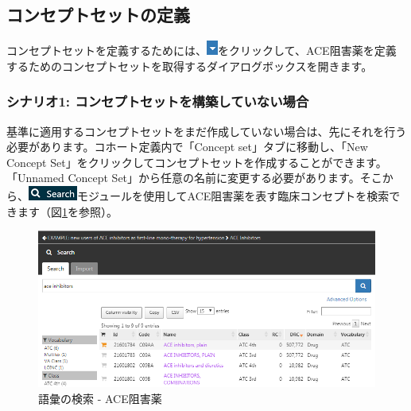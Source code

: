 \documentclass[
  11pt]{book}
\theoremstyle{definition}
\theoremstyle{definition}
\theoremstyle{definition}
\theoremstyle{definition}
\theoremstyle{remark}
\begin{document}
\subsection{コンセプトセットの定義}\label{ux30b3ux30f3ux30bbux30d7ux30c8ux30bbux30c3ux30c8ux306eux5b9aux7fa9}

コンセプトセットを定義するためには、\includegraphics{images/Cohorts/downarrow.png}をクリックして、ACE阻害薬を定義するためのコンセプトセットを取得するダイアログボックスを開きます。

\subsubsection*{シナリオ1: コンセプトセットを構築していない場合}\label{ux30b7ux30caux30eaux30aa1-ux30b3ux30f3ux30bbux30d7ux30c8ux30bbux30c3ux30c8ux3092ux69cbux7bc9ux3057ux3066ux3044ux306aux3044ux5834ux5408}

基準に適用するコンセプトセットをまだ作成していない場合は、先にそれを行う必要があります。コホート定義内で「Concept set」タブに移動し、「New Concept Set」をクリックしてコンセプトセットを作成することができます。「Unnamed Concept Set」から任意の名前に変更する必要があります。そこから、\includegraphics{images/Cohorts/search-2.png}モジュールを使用してACE阻害薬を表す臨床コンセプトを検索できます（図\ref{fig:aceinhibitors}を参照）。

\begin{figure}

{\centering \includegraphics[width=1\linewidth]{images/Cohorts/aceinhibitors} 

}

\caption{語彙の検索 - ACE阻害薬}\label{fig:aceinhibitors}
\end{figure}
\end{document}
